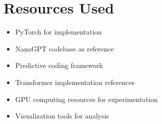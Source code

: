 \documentclass{article}
\begin{document}
\section{Resources Used}

\begin{itemize}
  \item PyTorch for implementation
  \item NanoGPT codebase as reference
  \item Predictive coding framework
  \item Transformer implementation references
  \item GPU computing resources for experimentation
  \item Visualization tools for analysis
\end{itemize}
\end{document}
